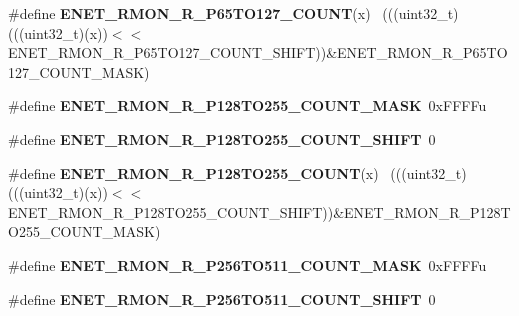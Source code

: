 \begin{DoxyCompactItemize}
\item 
\hypertarget{group___e_n_e_t___register___masks_ga4bee9a31b50a354128339dc81e2b63cc}{}\#define {\bfseries E\+N\+E\+T\+\_\+\+R\+M\+O\+N\+\_\+\+R\+\_\+\+P65\+T\+O127\+\_\+\+C\+O\+U\+N\+T}(x)                    ~(((uint32\+\_\+t)(((uint32\+\_\+t)(x))$<$$<$E\+N\+E\+T\+\_\+\+R\+M\+O\+N\+\_\+\+R\+\_\+\+P65\+T\+O127\+\_\+\+C\+O\+U\+N\+T\+\_\+\+S\+H\+I\+F\+T))\&E\+N\+E\+T\+\_\+\+R\+M\+O\+N\+\_\+\+R\+\_\+\+P65\+T\+O127\+\_\+\+C\+O\+U\+N\+T\+\_\+\+M\+A\+S\+K)\label{group___e_n_e_t___register___masks_ga4bee9a31b50a354128339dc81e2b63cc}

\item 
\hypertarget{group___e_n_e_t___register___masks_ga2d2913a282b447ccbf47ab61daa15197}{}\#define {\bfseries E\+N\+E\+T\+\_\+\+R\+M\+O\+N\+\_\+\+R\+\_\+\+P128\+T\+O255\+\_\+\+C\+O\+U\+N\+T\+\_\+\+M\+A\+S\+K}~0x\+F\+F\+F\+Fu\label{group___e_n_e_t___register___masks_ga2d2913a282b447ccbf47ab61daa15197}

\item 
\hypertarget{group___e_n_e_t___register___masks_gad89a09873f7fb8686264696f1bf396ea}{}\#define {\bfseries E\+N\+E\+T\+\_\+\+R\+M\+O\+N\+\_\+\+R\+\_\+\+P128\+T\+O255\+\_\+\+C\+O\+U\+N\+T\+\_\+\+S\+H\+I\+F\+T}~0\label{group___e_n_e_t___register___masks_gad89a09873f7fb8686264696f1bf396ea}

\item 
\hypertarget{group___e_n_e_t___register___masks_ga82bde09e3e0735d8997684b91bec2469}{}\#define {\bfseries E\+N\+E\+T\+\_\+\+R\+M\+O\+N\+\_\+\+R\+\_\+\+P128\+T\+O255\+\_\+\+C\+O\+U\+N\+T}(x)                  ~(((uint32\+\_\+t)(((uint32\+\_\+t)(x))$<$$<$E\+N\+E\+T\+\_\+\+R\+M\+O\+N\+\_\+\+R\+\_\+\+P128\+T\+O255\+\_\+\+C\+O\+U\+N\+T\+\_\+\+S\+H\+I\+F\+T))\&E\+N\+E\+T\+\_\+\+R\+M\+O\+N\+\_\+\+R\+\_\+\+P128\+T\+O255\+\_\+\+C\+O\+U\+N\+T\+\_\+\+M\+A\+S\+K)\label{group___e_n_e_t___register___masks_ga82bde09e3e0735d8997684b91bec2469}

\item 
\hypertarget{group___e_n_e_t___register___masks_ga0e2ba73bff150ae6ebad2d1b312a6ba2}{}\#define {\bfseries E\+N\+E\+T\+\_\+\+R\+M\+O\+N\+\_\+\+R\+\_\+\+P256\+T\+O511\+\_\+\+C\+O\+U\+N\+T\+\_\+\+M\+A\+S\+K}~0x\+F\+F\+F\+Fu\label{group___e_n_e_t___register___masks_ga0e2ba73bff150ae6ebad2d1b312a6ba2}

\item 
\hypertarget{group___e_n_e_t___register___masks_ga884a28c733b9e8454b467dabce9d1059}{}\#define {\bfseries E\+N\+E\+T\+\_\+\+R\+M\+O\+N\+\_\+\+R\+\_\+\+P256\+T\+O511\+\_\+\+C\+O\+U\+N\+T\+\_\+\+S\+H\+I\+F\+T}~0\label{group___e_n_e_t___register___masks_ga884a28c733b9e8454b467dabce9d1059}


\end{DoxyCompactItemize}
